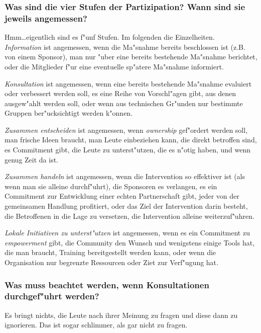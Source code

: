 \subsubsection{Was sind die vier Stufen der Partizipation? Wann sind sie jeweils angemessen?}
Hmm\ldots eigentlich sind es f"unf Stufen. Im folgenden die Einzelheiten.\\

\emph{Information} ist angemessen, wenn die Ma"snahme bereits beschlossen ist (z.B. von einem Sponsor), man nur "uber eine bereits bestehende Ma"snahme berichtet, oder die Mitglieder f"ur eine eventuelle sp"atere Ma"snahme informiert.

\emph{Konsultation} ist angemessen, wenn eine bereits bestehende Ma"snahme evaluiert oder verbessert werden soll, es eine Reihe von Vorschl"agen gibt, aus denen ausgew"ahlt werden soll, oder wenn aus technischen Gr"unden nur bestimmte Gruppen ber"ucksichtigt werden k"onnen.

\emph{Zusammen entscheiden} ist angemessen, wenn \emph{ownership} gef"ordert werden soll, man frische Ideen braucht, man Leute einbeziehen kann, die direkt betroffen sind, es Commitment gibt, die Leute zu unterst"utzen, die es n"otig haben, und wenn genug Zeit da ist.

\emph{Zusammen handeln} ist angemessen, wenn die Intervention so effektiver ist (als wenn man sie alleine durchf"uhrt), die Sponsoren es verlangen, es ein Commitment zur Entwicklung einer echten Partnerschaft gibt, jeder von der gemeinsamen Handlung profitiert, oder das Ziel der Intervention darin besteht, die Betroffenen in die Lage zu versetzen, die Intervention alleine weiterzuf"uhren. 

\emph{Lokale Initiativen zu unterst"utzen} ist angemessen, wenn es ein Commitment zu \emph{empowerment} gibt, die Community den Wunsch und wenigstens einige Tools hat, die man braucht, Training bereitgestellt werden kann, oder wenn die Organisation nur begrenzte Ressourcen oder Ziet zur Verf"ugung hat.

\subsubsection{Was muss beachtet werden, wenn Konsultationen durchgef"uhrt werden?}
Es bringt nichts, die Leute nach ihrer Meinung zu fragen und diese dann zu ignorieren. Das ist sogar schlimmer, als gar nicht zu fragen.

